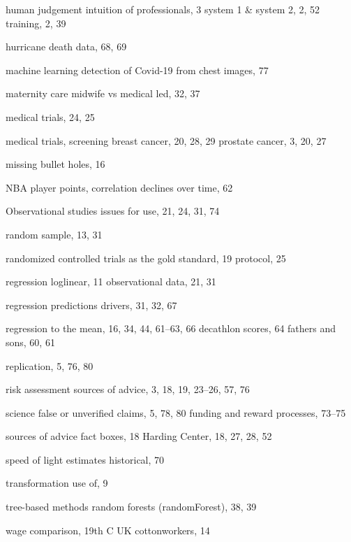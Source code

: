 \documentclass[
  10ptls,
  b5paper]{book}
\begin{document}
\begin{theindex}
  \indexspace

  \item human judgement
    \subitem intuition of professionals, 3
    \subitem system 1 \& system 2, 2, 52
    \subitem training, 2, 39
  \item hurricane death data, 68, 69

  \indexspace

  \item machine learning
    \subitem detection of Covid-19 from chest images, 77
  \item maternity care
    \subitem midwife vs medical led, 32, 37
  \item medical trials, 24, 25
  \item medical trials, screening
    \subitem breast cancer, 20, 28, 29
    \subitem prostate cancer, 3, 20, 27
  \item missing bullet holes, 16

  \indexspace

  \item NBA player points, correlation declines over time, 62

  \indexspace

  \item Observational studies
    \subitem issues for use, 21, 24, 31, 74

  \indexspace

  \item random sample, 13, 31
  \item randomized controlled trials
    \subitem as the gold standard, 19
    \subitem protocol, 25
  \item regression
    \subitem loglinear, 11
    \subitem observational data, 21, 31
  \item regression predictions
    \subitem drivers, 31, 32, 67
  \item regression to the mean, 16, 34, 44, 61--63, 66
    \subitem decathlon scores, 64
    \subitem fathers and sons, 60, 61
  \item replication, 5, 76, 80
  \item risk assessment
    \subitem sources of advice, 3, 18, 19, 23--26, 57, 76

  \indexspace

  \item science
    \subitem false or unverified claims, 5, 78, 80
    \subitem funding and reward processes, 73--75
  \item sources of advice
    \subitem fact boxes, 18
    \subitem Harding Center, 18, 27, 28, 52
  \item speed of light estimates
    \subitem historical, 70

  \indexspace

  \item transformation
    \subitem use of, 9
  \item tree-based methods
    \subitem random forests (randomForest), 38, 39

  \indexspace

  \item wage comparison, 19th C UK cottonworkers, 14

\end{theindex}
\end{document}
